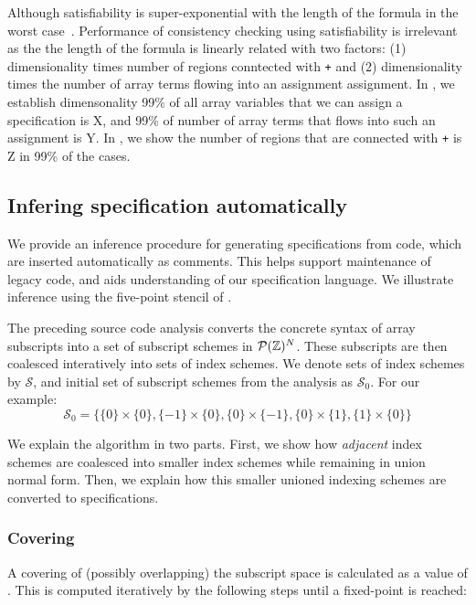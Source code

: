 Although satisfiability is super-exponential with the length of the formula in
the worst case~\cite{fischer1974super}. Performance of consistency checking
using satisfiability is irrelevant as the the length of the formula is linearly
related with two factors: (1) dimensionality times number of regions conntected
with \texttt{+} and (2) dimensionality times the number of array terms flowing
into an assignment assignment. In , we establish dimensonality
99\% of all array variables that we can assign a specification is X, and 99\% of
number of array terms that flows into such an assignment is Y. In
, we show the number of regions that are connected with
\texttt{+} is Z in 99\% of the cases.


\subsection{Infering specification automatically}
\label{subsec:inference}
%
We provide an inference procedure for generating specifications from
code, which are inserted automatically as comments. This helps support
maintenance of legacy code, and aids understanding of our
specification language. We illustrate inference using the
five-point stencil of .

The preceding source code analysis converts the concrete syntax of
array subscripts into a set of subscript schemes in
$\mathcal{P}(\textnormal{$\mathbb{Z}$})^N$. These subscripts are then coalesced interatively
into sets of index schemes. We denote sets of index schemes by
$\mathcal{S}$, and initial set of subscript schemes from the analysis
as $\mathcal{S}_0$. For our example:
%
\begin{equation*}
\mathcal{S}_0 = \{\{0\} \times \{0\}, \{-1\} \times \{0\},
\{0\} \times \{-1\}, \{0\} \times \{1\}, \{1\} \times \{0\}\}
\end{equation*}


We explain the algorithm in two parts. First, we show how \emph{adjacent} index
schemes are coalesced into smaller index schemes while remaining in union normal
form. Then, we explain how this smaller unioned indexing schemes are converted
to specifications.

\subsubsection{Covering}
A covering of (possibly overlapping) the subscript space
is calculated as a value of . This is computed iteratively
by the following steps until a fixed-point is reached:

